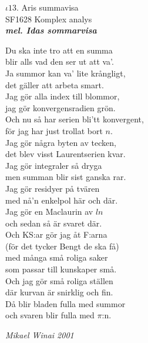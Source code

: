 \documentclass[a6paper,10pt]{article}
\newcommand{\mel}[1]{\small\textbf{\textit{mel. #1 \\}}}
\begin{document}
\setlength{\oddsidemargin}{-0.47in}
\noindent
\begin{center}
\Large $\iota13$. Aris summavisa \\ 
\footnotesize SF1628 Komplex analys\\
\mel{Idas sommarvisa}
\end{center}
Du ska inte tro att en summa \\
blir alls vad den ser ut att va'. \\
Ja summor kan va' lite krångligt, \\
det gäller att arbeta smart. 
\vspace{5pt} \\
Jag gör alla index till blommor, \\
jag gör konvergensradien grön. \\
Och nu så har serien bli'tt konvergent, \\
för jag har just trollat bort $n$. 
\vspace{5pt} \\
Jag gör några byten av tecken, \\
det blev visst Laurentserien kvar. \\
Jag gör integraler så dryga \\
men summan blir sist ganska rar. 
\vspace{5pt} \\
Jag gör residyer på tvären \\
med nå'n enkelpol här och där. \\
Jag gör en Maclaurin av $ln$ \\
och sedan så är svaret där. 
\vspace{5pt} \\
Och KS:ar gör jag åt F:arna \\
(för det tycker Bengt de ska få) \\
med många små roliga saker \\
som passar till kunskaper små. 
\vspace{5pt} \\
Och jag gör små roliga ställen \\
där kurvan är snirklig och fin. \\
Då blir bladen fulla med summor \\
och svaren blir fulla med $\pi$:n.
\begin{flushright}
\textit{Mikael Winai 2001}
\end{flushright}
\end{document}
